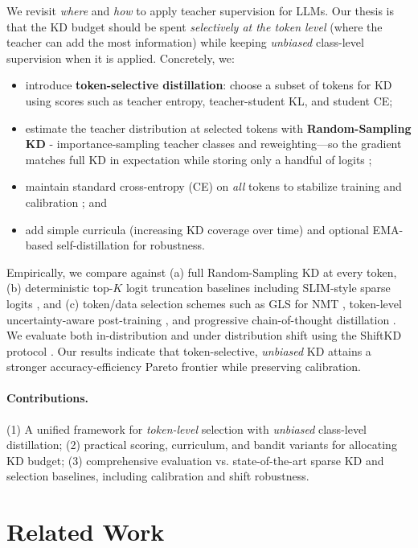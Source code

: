 \documentclass[11pt]{article}
\begin{document}
We revisit \emph{where} and \emph{how} to apply teacher supervision for LLMs. Our thesis is that the KD budget should be spent \emph{selectively at the token level} (where the teacher can add the most information) while keeping \emph{unbiased} class-level supervision when it is applied. Concretely, we:

\begin{itemize}
\item introduce \textbf{token-selective distillation}: choose a subset of tokens for KD using scores such as teacher entropy, teacher-student KL, and student CE;
\item estimate the teacher distribution at selected tokens with \textbf{Random-Sampling KD} - importance-sampling teacher classes and reweighting—so the gradient matches full KD in expectation while storing only a handful of logits \citep{anshumann2025sparse};
\item maintain standard cross-entropy (CE) on \emph{all} tokens to stabilize training and calibration \citep{guo2017calibration}; and
\item add simple curricula (increasing KD coverage over time) and optional EMA-based self-distillation for robustness.
\end{itemize}

Empirically, we compare against (a) full Random-Sampling KD at every token, (b) deterministic top-$K$ logit truncation baselines including SLIM-style sparse logits \citep{raman2023slim}, and (c) token/data selection schemes such as GLS for NMT \citep{wang2021selectivekd}, token-level uncertainty-aware post-training \citep{liu2025tokenlevel}, and progressive chain-of-thought distillation \citep{feng2024kpod}. We evaluate both in-distribution and under distribution shift using the ShiftKD protocol \citep{zhang2023shiftkd}. Our results indicate that token-selective, \emph{unbiased} KD attains a stronger accuracy-efficiency Pareto frontier while preserving calibration.

\paragraph{Contributions.} (1) A unified framework for \emph{token-level} selection with \emph{unbiased} class-level distillation; (2) practical scoring, curriculum, and bandit variants for allocating KD budget; (3) comprehensive evaluation vs. state-of-the-art sparse KD and selection baselines, including calibration and shift robustness.

\section{Related Work}
\end{document}
